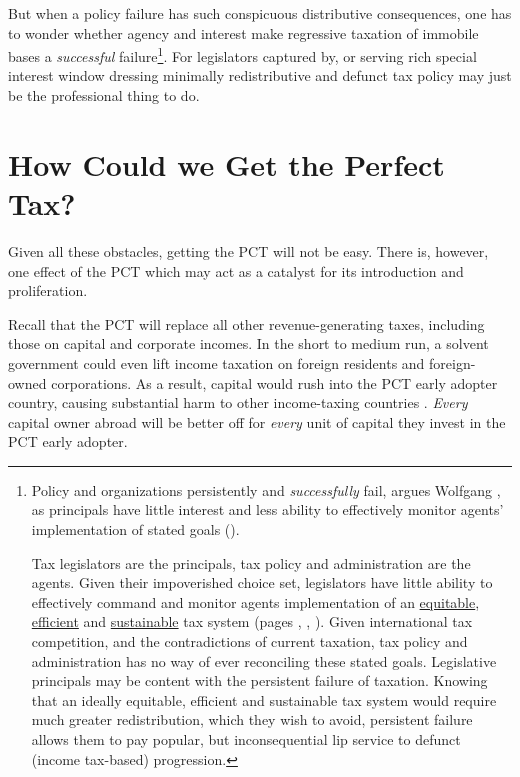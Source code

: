 But when a policy failure has such conspicuous distributive consequences, one has to wonder whether agency and interest make regressive taxation of immobile bases a \emph{successful} failure\footnote{Policy and organizations persistently and \emph{successfully} fail, argues Wolfgang \citeauthor{Seibel-1996-aa}, as principals have little interest and less ability to effectively monitor agents' implementation of stated goals (\citeyear{Seibel-1996-aa}).

Tax legislators are the principals, tax policy and administration are the agents.
Given their impoverished choice set, legislators have little ability to effectively command and monitor agents implementation of an \hyperref[sec:tax-justice]{equitable}, \hyperref[sec:tax-optimality]{efficient} and \hyperref[sec:tax-sustainability]{sustainable} tax system (pages \pageref{sec:tax-justice}, \pageref{sec:tax-optimality}, \pageref{sec:tax-sustainability}).
Given international tax competition, and the contradictions of current taxation, tax policy and administration has no way of ever reconciling these stated goals.
Legislative principals may be content with the persistent failure of taxation.
Knowing that an ideally equitable, efficient and sustainable tax system would require much greater redistribution, which they wish to avoid, persistent failure allows them to pay popular, but inconsequential lip service to defunct (income tax-based) progression.}.
For legislators captured by, or serving rich special interest window dressing minimally redistributive and defunct tax policy may just be the professional thing to do.

\section[Prospects of the PCT]{How Could we Get the Perfect Tax?}
	\label{sec:HowToGetIt}
Given all these obstacles, getting the PCT will not be easy.
There is, however, one effect of the PCT which may act as a catalyst for its introduction and proliferation.

Recall that the PCT will replace all other revenue-generating taxes, including those on capital and corporate incomes.
In the short to medium run, a solvent government could even lift income taxation on foreign residents and foreign-owned corporations.
As a result, capital would rush into the PCT early adopter country, causing substantial harm to other income-taxing countries \citep[12]{Dalsgaard2005}.
\emph{Every} capital owner abroad will be better off for \emph{every} unit of capital they invest in the PCT early adopter.


